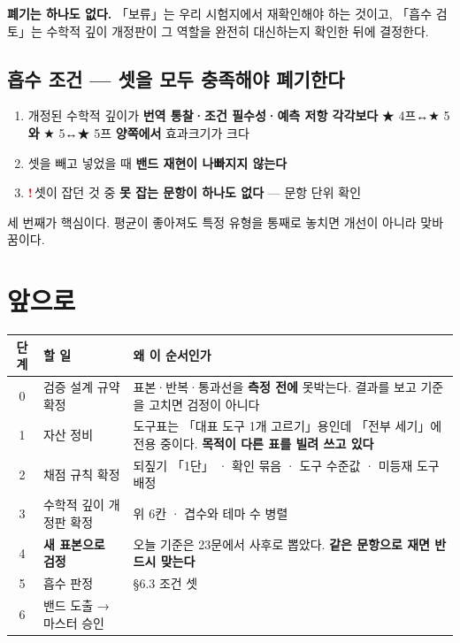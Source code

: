 \documentclass[11pt]{article}
\newcommand{\R}{\textcolor{red}{\textbf{!}}\,}
\begin{document}
\textbf{폐기는 하나도 없다.} 「보류」는 우리 시험지에서 재확인해야 하는 것이고,
「흡수 검토」는 수학적 깊이 개정판이 그 역할을 완전히 대신하는지 확인한 뒤에 결정한다.

\subsection{흡수 조건 — 셋을 모두 충족해야 폐기한다}

\begin{enumerate}
\item 개정된 수학적 깊이가 \textbf{번역 통찰·조건 필수성·예측 저항 각각보다}
★ 4프↔★ 5 \textbf{와} ★ 5↔★ 5프 \textbf{양쪽에서} 효과크기가 크다
\item 셋을 빼고 넣었을 때 \textbf{밴드 재현이 나빠지지 않는다}
\item \R 셋이 잡던 것 중 \textbf{못 잡는 문항이 하나도 없다} — 문항 단위 확인
\end{enumerate}

세 번째가 핵심이다. 평균이 좋아져도 특정 유형을 통째로 놓치면 개선이 아니라 맞바꿈이다.

\section{앞으로}

\begin{center}
\begin{tabular}{@{}clp{72mm}@{}}
\toprule
\textbf{단계} & \textbf{할 일} & \textbf{왜 이 순서인가} \\
\midrule
0 & 검증 설계 규약 확정 & 표본·반복·통과선을 \textbf{측정 전에} 못박는다. 결과를 보고 기준을 고치면 검정이 아니다 \\
1 & 자산 정비 & 도구표는 「대표 도구 1개 고르기」용인데 「전부 세기」에 전용 중이다. \textbf{목적이 다른 표를 빌려 쓰고 있다} \\
2 & 채점 규칙 확정 & 되짚기 「1단」 · 확인 묶음 · 도구 수준값 · 미등재 도구 배정 \\
3 & 수학적 깊이 개정판 확정 & 위 6칸 · 겹수와 테마 수 병렬 \\
4 & \textbf{새 표본으로 검정} & 오늘 기준은 23문에서 사후로 뽑았다. \textbf{같은 문항으로 재면 반드시 맞는다} \\
5 & 흡수 판정 & \S6.3 조건 셋 \\
6 & 밴드 도출 → 마스터 승인 & \\
\bottomrule
\end{tabular}
\end{center}
\end{document}
